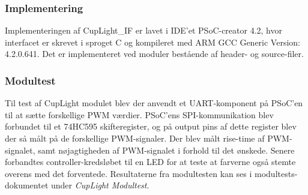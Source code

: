 \documentclass[Rapport/Rapport_main.tex]{subfiles}
\begin{document}
\subsubsection{Implementering}
Implementeringen af CupLight\_IF er lavet i IDE'et PSoC-creator 4.2, hvor interfacet er skrevet i sproget C og kompileret med ARM GCC Generic Version: 4.2.0.641. Det er implementeret ved moduler bestående af header- og source-filer.
\subsubsection{Modultest}
Til test af CupLight modulet blev der anvendt et UART-komponent på PSoC'en til at sætte forskellige PWM værdier. PSoC'ens SPI-kommunikation blev forbundet til et 74HC595 skifteregister, og på output pins af dette register blev der så målt på de forskellige PWM-signaler. Der blev målt rise-time af PWM-signalet, samt nøjagtigheden af PWM-signalet i forhold til det ønskede. Senere forbandtes controller-kredsløbet til en LED for at teste at farverne også stemte overens med det forventede. Resultaterne fra modultesten kan ses i modultests-dokumentet under \textit{CupLight Modultest}.
\end{document}
